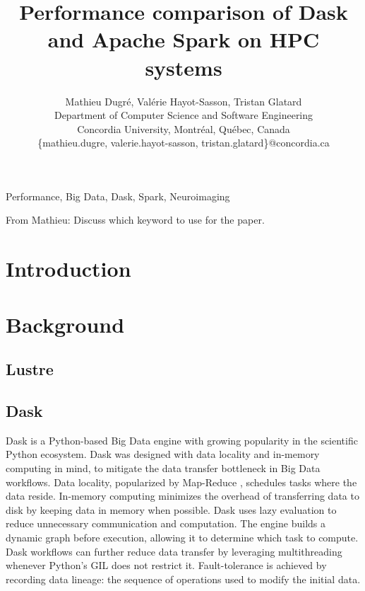 \documentclass[conference]{IEEEtran}
\newcommand{\MD}[1]{\color{magenta}From Mathieu: #1 \color{black}}
\begin{document}
\title{Performance comparison of Dask and Apache Spark on HPC systems}

\author{Mathieu Dugr\'e, Val\'erie Hayot-Sasson, Tristan Glatard\\
	Department of Computer Science and Software Engineering\\
	Concordia University, Montr\'eal, Qu\'ebec, Canada\\
	\{mathieu.dugre, valerie.hayot-sasson, tristan.glatard\}@concordia.ca
	\vspace*{0.8cm} %
}

\maketitle

\begin{abstract}
\end{abstract}

\begin{IEEEkeywords}
	Performance, Big Data, Dask, Spark, Neuroimaging
\end{IEEEkeywords}
\MD{Discuss which keyword to use for the paper.}

\section{Introduction}

\section{Background}
\subsection{Lustre} %

\subsection{Dask}
Dask is a Python-based Big Data engine with growing popularity in the scientific Python ecosystem.
Dask was designed with data locality and in-memory computing in mind, to mitigate the data transfer bottleneck in Big Data workflows.
Data locality, popularized by Map-Reduce \cite{dean2008mapreduce}, schedules tasks where the data reside.
In-memory computing minimizes the overhead of transferring data to disk by keeping data in memory when possible.
Dask uses lazy evaluation to reduce unnecessary communication and computation.
The engine builds a dynamic graph before execution, allowing it to determine which task to compute.
Dask workflows can further reduce data transfer by leveraging multithreading whenever Python's GIL does not restrict it.
Fault-tolerance is achieved by recording data lineage: the sequence of operations used to modify the initial data.
\end{document}
